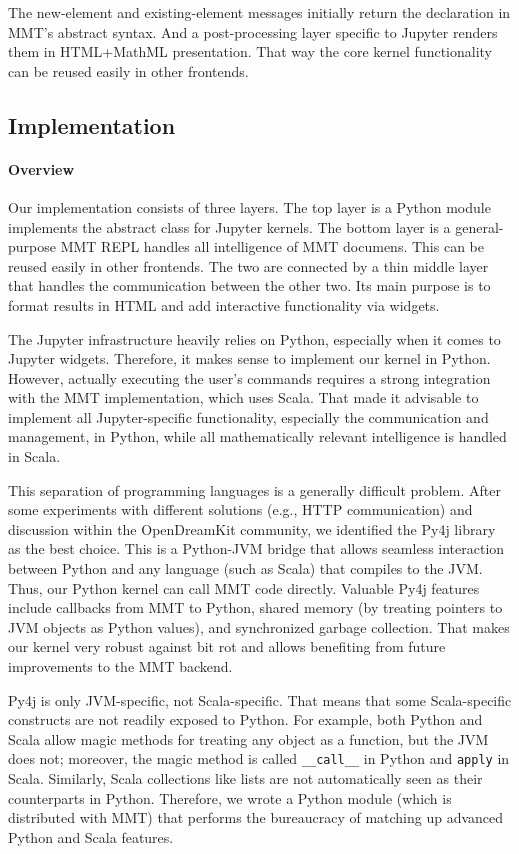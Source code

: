 The new-element and existing-element messages initially return the declaration in MMT's abstract syntax.
And a post-processing layer specific to Jupyter renders them in HTML+MathML presentation.
That way the core kernel functionality can be reused easily in other frontends.

\subsection{Implementation}\label{sec:kernel:impl}

\paragraph{Overview}
Our implementation consists of three layers.
The top layer is a Python module implements the abstract class for Jupyter kernels.
The bottom layer is a general-purpose MMT REPL handles all intelligence of MMT documens.
This can be reused easily in other frontends.
The two are connected by a thin middle layer that handles the communication between the other two.
Its main purpose is to format results in HTML and add interactive functionality via widgets.

The Jupyter infrastructure heavily relies on Python, especially when it comes to Jupyter widgets.
Therefore, it makes sense to implement our kernel in Python.
However, actually executing the user's commands requires a strong integration with the MMT implementation, which uses Scala.
That made it advisable to implement all Jupyter-specific functionality, especially the communication and management, in Python, while all mathematically relevant intelligence is handled in Scala.

This separation of programming languages is a generally difficult problem.
After some experiments with different solutions (e.g., HTTP communication) and discussion within the OpenDreamKit community, we identified the Py4j library as the best choice.
This is a Python-JVM bridge that allows seamless interaction between Python and any language (such as Scala) that compiles to the JVM.
Thus, our Python kernel can call MMT code directly.
Valuable Py4j features include callbacks from MMT to Python, shared memory (by treating pointers to JVM objects as Python values), and synchronized garbage collection.
That makes our kernel very robust against bit rot and allows benefiting from future improvements to the MMT backend.

Py4j is only JVM-specific, not Scala-specific.
That means that some Scala-specific constructs are not readily exposed to Python.
For example, both Python and Scala allow magic methods for treating any object as a function, but the JVM does not; moreover, the magic method is called \texttt{\_\_call\_\_} in Python and \texttt{apply} in Scala.
Similarly, Scala collections like lists are not automatically seen as their counterparts in Python.
Therefore, we wrote a Python module (which is distributed with MMT) that performs the bureaucracy of matching up advanced Python and Scala features.

